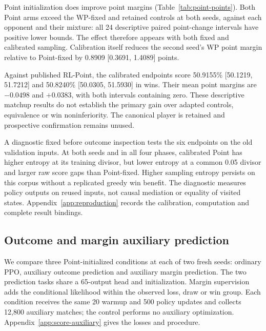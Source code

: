 \begin{table}[htbp]
\centering\small

\caption{Point-calibrated development win changes in percentage points.
One simultaneous 95\% family covers all four contrasts; 10,000 bootstrap
replicates resample 4,096 compound blocks preserving all policies and seats.}
\label{tab:point-primary}
\end{table}

Point initialization does improve point margins (Table~\ref{tab:point-points}).
Both Point arms exceed the WP-fixed and retained controls at both seeds,
against each opponent and their mixture: all 24 descriptive paired point-change
intervals have positive lower bounds. The effect therefore appears with both
fixed and calibrated sampling. Calibration itself reduces the second seed's
WP point margin relative to Point-fixed by 0.8909 [0.3691, 1.4089] points.

\begin{table}[htbp]
\centering\small

\caption{Equal-mixture point-margin improvements under Point initialization.
Intervals are descriptive marginal 95\%. Margins are candidate minus opponent;
they are twice the original paper's final-minus-initial point convention.}
\label{tab:point-points}
\end{table}

Against published RL-Point, the calibrated endpoints score 50.9155\%
[50.1219, 51.7212] and 50.8240\% [50.0305, 51.5930] in wins. Their mean point
margins are $-0.0498$ and $+0.0383$, with both intervals containing zero.
These descriptive matchup results do not establish the primary gain over
adapted controls, equivalence or win noninferiority. The canonical player is
retained and prospective confirmation remains unused.

A diagnostic fixed before outcome inspection tests the six endpoints on the
old validation inputs. At both seeds and in all four phases, calibrated Point
has higher entropy at its training divisor, but lower entropy at a common
0.05 divisor and larger raw score gaps than Point-fixed. Higher sampling
entropy persists on this corpus without a replicated greedy win benefit.
The diagnostic measures policy outputs on reused inputs, not causal mediation
or equality of visited states. Appendix~\ref{app:reproduction} records the
calibration, computation and complete result bindings.

\subsection{Outcome and margin auxiliary prediction}
\label{sec:score-auxiliary}
We compare three Point-initialized conditions at each of two fresh seeds:
ordinary PPO, auxiliary outcome prediction and auxiliary margin prediction.
The two prediction tasks share a 65-output head and initialization. Margin
supervision adds the conditional likelihood within the observed loss, draw or
win group. Each condition receives the same 20 warmup and 500 policy updates
and collects 12,800 auxiliary matches; the control performs no auxiliary
optimization. Appendix~\ref{app:score-auxiliary} gives the losses and procedure.

